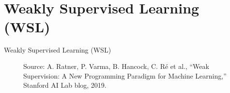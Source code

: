 \section{Weakly Supervised Learning (WSL)}
\begin{frame}{}
    \LARGE Weakly Supervised Learning (WSL)
\end{frame}

\begin{frame}[allowframebreaks]{}
    \begin{figure}
        \centering
        {\footnotesize Source: A. Ratner, P. Varma, B. Hancock, C. R\'e et al., ``Weak Supervision: A New Programming Paradigm for Machine Learning,'' Stanford AI Lab blog, 2019.}
    \end{figure}
\end{frame}

